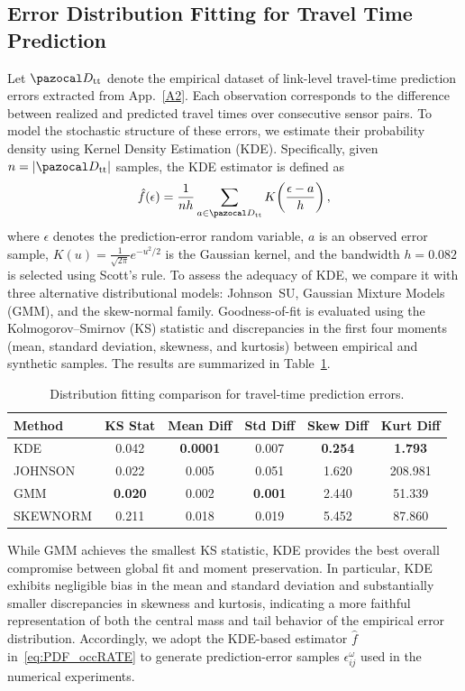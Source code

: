 \documentclass[a4paper,fleqn]{cas-sc}
\begin{document}
\subsection{Error Distribution Fitting for Travel Time Prediction}\label{A3}
Let $\pazocal D_{\text{tt}}$ denote the empirical dataset of link-level travel-time prediction errors extracted from App.~\ref{A2}.
Each observation corresponds to the difference between realized and predicted travel times over consecutive sensor pairs.
%
To model the stochastic structure of these errors, we estimate their probability density using Kernel Density Estimation (KDE).
Specifically, given $n = |\pazocal D_{\text{tt}}|$ samples, the KDE estimator is defined as
\begin{equation}
\hat f(\epsilon)
=\frac{1}{n h}
\sum_{a\in\pazocal D_{\text{tt}}}
K\!\left(\frac{\epsilon-a}{h}\right),
\label{eq:PDF_occRATE}
\end{equation}
where $\epsilon$ denotes the prediction-error random variable, $a$ is an observed error sample,
$K(u)=\frac{1}{\sqrt{2\pi}}e^{-u^{2}/2}$ is the Gaussian kernel, and
the bandwidth $h=0.082$ is selected using Scott’s rule.
%
To assess the adequacy of KDE, we compare it with three alternative distributional models:
Johnson~SU, Gaussian Mixture Models (GMM), and the skew-normal family.
Goodness-of-fit is evaluated using the Kolmogorov--Smirnov (KS) statistic and discrepancies in the first four moments
(mean, standard deviation, skewness, and kurtosis) between empirical and synthetic samples.
The results are summarized in Table~\ref{tab:dist_comparison}.
%
\begin{table}[h]
\centering
\small
\begin{tabular}{lccccc}
\toprule
Method   & KS Stat & Mean Diff & Std Diff & Skew Diff & Kurt Diff \\
\midrule
KDE      & 0.042   & \textbf{0.0001} & 0.007 & \textbf{0.254} & \textbf{1.793} \\
JOHNSON  & 0.022   & 0.005           & 0.051 & 1.620          & 208.981        \\
GMM      & \textbf{0.020} & 0.002   & \textbf{0.001} & 2.440 & 51.339 \\
SKEWNORM & 0.211   & 0.018           & 0.019 & 5.452          & 87.860         \\
\bottomrule
\end{tabular}
\caption{Distribution fitting comparison for travel-time prediction errors.}
\label{tab:dist_comparison}
\end{table}
%
While GMM achieves the smallest KS statistic, KDE provides the best overall compromise between global fit and moment preservation.
In particular, KDE exhibits negligible bias in the mean and standard deviation and substantially smaller discrepancies in skewness and kurtosis,
indicating a more faithful representation of both the central mass and tail behavior of the empirical error distribution.
%
Accordingly, we adopt the KDE-based estimator $\hat f$ in~\eqref{eq:PDF_occRATE} to generate prediction-error samples
$\epsilon_{ij}^{\omega}$ used in the numerical experiments.
\end{document}

